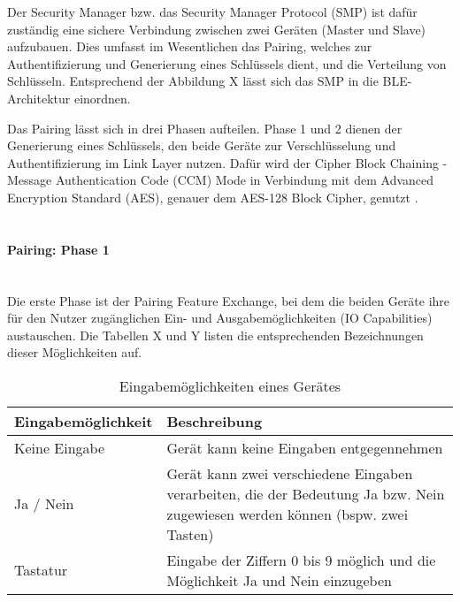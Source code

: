 Der Security Manager bzw. das Security Manager Protocol (SMP) ist dafür zuständig eine sichere Verbindung zwischen zwei Geräten (Master und Slave) aufzubauen. Dies umfasst im Wesentlichen das Pairing, welches zur Authentifizierung und Generierung eines Schlüssels dient, und die Verteilung von Schlüsseln. Entsprechend der Abbildung X lässt sich das SMP in die BLE-Architektur einordnen.

Das Pairing lässt sich in drei Phasen aufteilen. Phase 1 und 2 dienen der Generierung eines Schlüssels, den beide Geräte zur Verschlüsselung und Authentifizierung im Link Layer nutzen. Dafür wird der Cipher Block Chaining - Message Authentication Code (CCM) Mode in Verbindung mit dem Advanced Encryption Standard (AES), genauer dem AES-128 Block Cipher, genutzt \cite{BtSpec4.0_2285}.
\\\\

\paragraph{Pairing: Phase 1} \mbox{} \vspace{0.2cm} \\

Die erste Phase ist der Pairing Feature Exchange, bei dem die beiden Geräte ihre für den Nutzer zugänglichen Ein- und Ausgabemöglichkeiten (IO Capabilities) austauschen. Die Tabellen X und Y 
listen die entsprechenden Bezeichnungen dieser Möglichkeiten auf.

\begin{table}
    \begin{tabularx}{\textwidth}{|l|X|}
    \hline
    \textbf{Eingabemöglichkeit} & \textbf{Beschreibung} \\
    \hline
    Keine Eingabe & Gerät kann keine Eingaben entgegennehmen \\
    \hline
    Ja / Nein & Gerät kann zwei verschiedene Eingaben verarbeiten, die der Bedeutung Ja bzw. Nein zugewiesen werden können (bspw. zwei Tasten) \\
    \hline
    Tastatur & Eingabe der Ziffern 0 bis 9 möglich und die Möglichkeit Ja und Nein einzugeben \\
    \hline
    \end{tabularx}
    \caption[Eingabemöglichkeiten eines Gerätes]{Eingabemöglichkeiten eines Gerätes \cite{BtSpec4.0_1965}}
\end{table}

